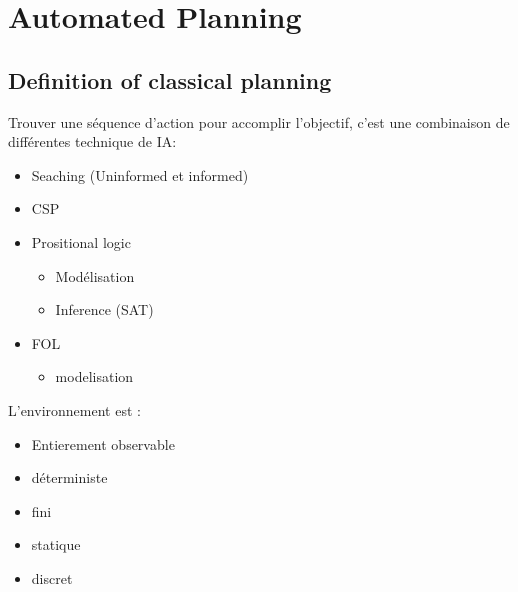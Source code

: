 \section{Automated Planning}
	\subsection{Definition of classical planning}
		Trouver une séquence d'action pour accomplir l'objectif, c'est une combinaison de différentes technique de IA:
		\begin{itemize}
			\item Seaching (Uninformed et informed)
			\item CSP
			\item Prositional logic
			\begin{itemize}
				\item Modélisation
				\item Inference (SAT)
			\end{itemize}
			\item FOL
			\begin{itemize}
				\item modelisation
			\end{itemize}
		\end{itemize}
		
		L'environnement est :
		\begin{itemize}
			\item Entierement observable
			\item déterministe 
			\item fini
			\item statique
			\item discret
		\end{itemize}
		
